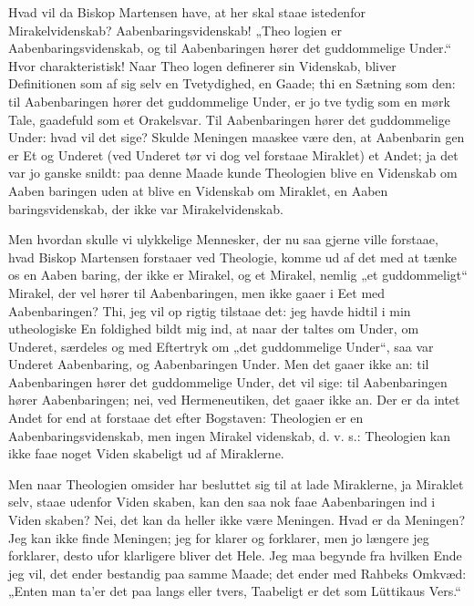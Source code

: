 \documentclass[12pt]{book}
\newcommand{\opage}[1]{\marginnote{\footnotesize\textit{[#1]}}}
\begin{document}
Hvad vil da Biskop Martensen have, at her skal staae
istedenfor Mirakelvidenskab? Aabenbaringsvidenskab! „Theo\-%
logien er Aabenbaringsvidenskab, og til Aabenbaringen hører
det guddommelige Under.“ Hvor charakteristisk! Naar Theo\-%
logen definerer sin Videnskab, bliver Definitionen som af sig
selv en Tvetydighed, en Gaade; thi en Sætning som den:
til Aabenbaringen hører det guddommelige Under, er jo tve\-%
tydig som en mørk Tale, gaadefuld som et Orakelsvar. Til
Aabenbaringen hører det guddommelige Under: hvad vil det
sige? Skulde Meningen maaskee være den, at Aabenbarin\-%
gen er Et og Underet (ved Underet tør vi dog vel forstaae
Miraklet) et Andet; ja det var jo ganske snildt: paa denne
Maade kunde Theologien blive en Videnskab om Aaben\-%
baringen uden at blive en Videnskab om Miraklet, en Aaben\-%
baringsvidenskab, der ikke var Mirakelvidenskab.

Men hvordan skulle vi ulykkelige Mennesker, der nu
saa gjerne ville forstaae, hvad Biskop Martensen forstaaer
ved Theologie, komme ud af det med at tænke os en Aaben\-%
baring, der ikke er Mirakel, og et Mirakel, nemlig „et
\opage{83}\setcounter{footnote}{0}%
guddommeligt“ Mirakel, der vel hører til Aabenbaringen,
men ikke gaaer i Eet med Aabenbaringen? Thi, jeg vil op\-%
rigtig tilstaae det: jeg havde hidtil i min utheologiske En\-%
foldighed bildt mig ind, at naar der taltes om Under, om
Underet, særdeles og med Eftertryk om „det guddommelige
Under“, saa var Underet Aabenbaring, og Aabenbaringen
Under. Men det gaaer ikke an: til Aabenbaringen hører det
guddommelige Under, det vil sige: til Aabenbaringen hører
Aabenbaringen; nei, ved Hermeneutiken, det gaaer ikke an.
Der er da intet Andet for end at forstaae det efter Bogstaven:
Theologien er en Aabenbaringsvidenskab, men ingen Mirakel\-%
videnskab, d. v. s.: Theologien kan ikke faae noget Viden\-%
skabeligt ud af Miraklerne.

Men naar Theologien omsider har besluttet sig til at
lade Miraklerne, ja Miraklet selv, staae udenfor Viden\-%
skaben, kan den saa nok faae Aabenbaringen ind i Viden\-%
skaben? Nei, det kan da heller ikke være Meningen. Hvad
er da Meningen? Jeg kan ikke finde Meningen; jeg for\-%
klarer og forklarer, men jo længere jeg forklarer, desto ufor\-%
klarligere bliver det Hele. Jeg maa begynde fra hvilken
Ende jeg vil, det ender bestandig paa samme Maade; det
ender med Rahbeks Omkvæd: „Enten man ta'er det paa
langs eller tvers, Taabeligt er det som Lüttikaus Vers.“
\end{document}

